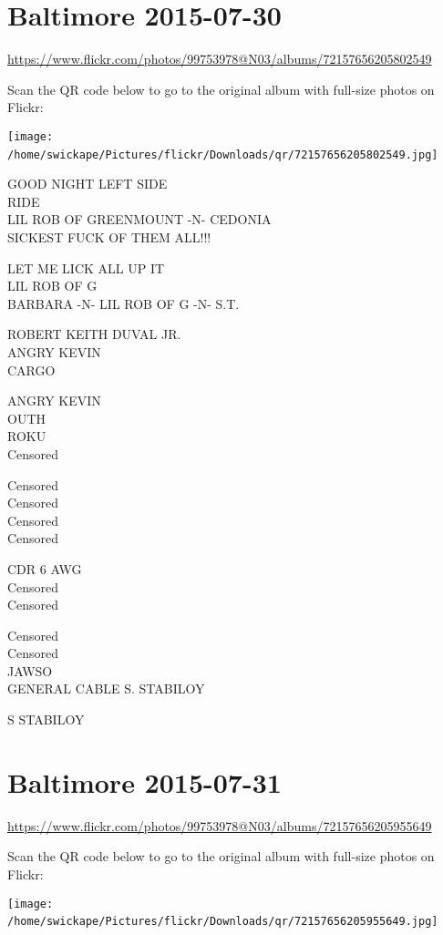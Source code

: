 \documentclass[10pt,letterpaper]{article}
\begin{document}
\section*{Baltimore 2015-07-30}

\url{https://www.flickr.com/photos/99753978@N03/albums/72157656205802549}

Scan the QR code below to go to the original album with full-size photos on Flickr:

\texttt{[image: /home/swickape/Pictures/flickr/Downloads/qr/72157656205802549.jpg]}
\

GOOD NIGHT LEFT SIDE\\
RIDE\\
LIL ROB OF GREENMOUNT {-}N{-} CEDONIA\\
SICKEST FUCK OF THEM ALL!!!

LET ME LICK ALL UP IT\\
LIL ROB OF G\\
BARBARA {-}N{-} LIL ROB OF G {-}N{-} S.T.

ROBERT KEITH DUVAL JR.\\
ANGRY KEVIN\\
CARGO

ANGRY KEVIN\\
OUTH\\
ROKU\\
Censored

Censored\\
Censored\\
Censored\\
Censored

CDR 6 AWG\\
Censored\\
Censored

Censored\\
Censored\\
JAWSO\\
GENERAL CABLE S. STABILOY

S STABILOY
\

\section*{Baltimore 2015-07-31}

\url{https://www.flickr.com/photos/99753978@N03/albums/72157656205955649}

Scan the QR code below to go to the original album with full-size photos on Flickr:

\texttt{[image: /home/swickape/Pictures/flickr/Downloads/qr/72157656205955649.jpg]}
\
\end{document}
